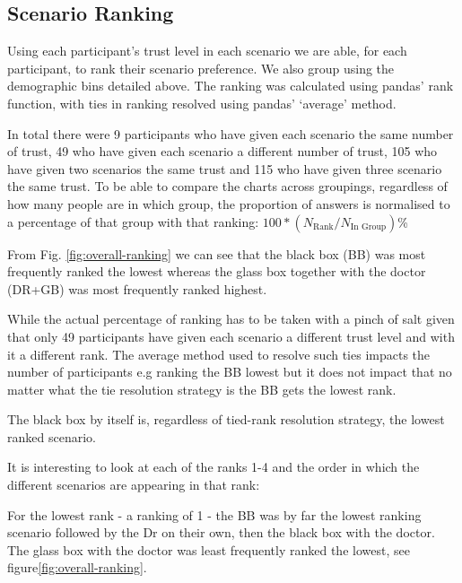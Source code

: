 \documentclass[manuscript,screen,review]{acmart}
\begin{document}
\subsection{Scenario Ranking}


Using each participant's trust level in each scenario we are able, for each participant, to rank their scenario preference. We also group using the demographic bins detailed above. The ranking was calculated using pandas' rank function, with ties in ranking resolved using pandas' `average' method\cite{mckinney-proc-scipy-2010}.

In total there were 9 participants who have given each scenario the same number of trust, 49 who have given each scenario a different number of trust, 105 who have given two scenarios the same trust and 115 who have given three scenario the same trust.  To be able to compare the charts across groupings, regardless of how many people are in which group, the proportion of answers is normalised to a percentage of that group with that ranking: $100*(N_{\textrm{Rank}}/N_{\textrm{In Group}})$\%



From Fig. \ref{fig:overall-ranking} we can see that the black box (BB) was most frequently ranked the lowest whereas the glass box together with the doctor (DR+GB) was most frequently ranked highest.

While the actual percentage of ranking has to be taken with a pinch of salt given that only 49 participants have given each scenario a different trust level and with it a different rank. The average method used to resolve such ties impacts the number of participants e.g ranking the BB lowest but it does not impact that no matter what the tie resolution strategy is the BB gets the lowest rank.

The black box by itself is, regardless of tied-rank resolution strategy, the lowest ranked scenario.

It is interesting to look at each of the ranks 1-4 and the order in which the different scenarios are appearing in that rank:

For the lowest rank - a ranking of 1 - the BB was by far the lowest ranking scenario followed by the Dr on their own, then the black box with the doctor. The glass box with the doctor was  least frequently ranked the lowest, see figure\ref{fig:overall-ranking}.
\end{document}
